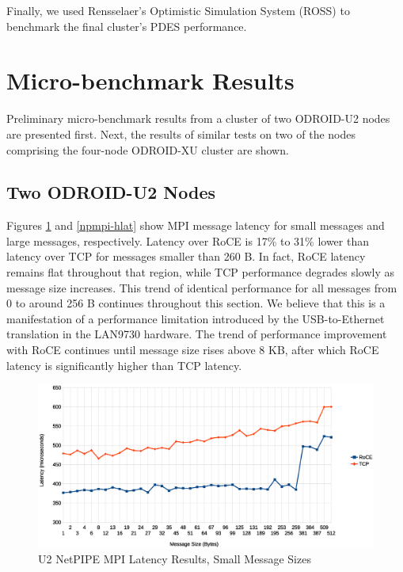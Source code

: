 \documentclass[11pt]{book}
\begin{document}
Finally, we used Rensselaer's Optimistic Simulation System (ROSS) to benchmark
the final cluster's PDES performance.

\section{Micro-benchmark Results}

Preliminary micro-benchmark results from a cluster of two ODROID-U2 nodes are presented
first.  Next, the results of similar tests on two of the nodes comprising the four-node
ODROID-XU cluster are shown.

\subsection{Two ODROID-U2 Nodes}

Figures \ref{npmpi-llat} and \ref{npmpi-hlat} show MPI message latency for small messages
and large messages, respectively.  Latency over RoCE is 17\% to 31\% lower than latency
over TCP for messages smaller than 260 B.  In fact, RoCE latency remains flat throughout
that region, while TCP performance degrades slowly as message size increases.  This trend
of identical performance for all messages from 0 to around 256 B continues throughout this
section.  We believe that this is a manifestation of a performance limitation introduced
by the USB-to-Ethernet translation in the LAN9730 hardware.  The trend of performance
improvement with RoCE continues until message size rises above 8 KB, after which RoCE
latency is significantly higher than TCP latency.


\begin{figure}
\includegraphics[width=\textwidth]{netpipe_lat_small}
\caption{U2 NetPIPE MPI Latency Results, Small Message Sizes}\label{npmpi-llat}
\end{figure}
\end{document}
